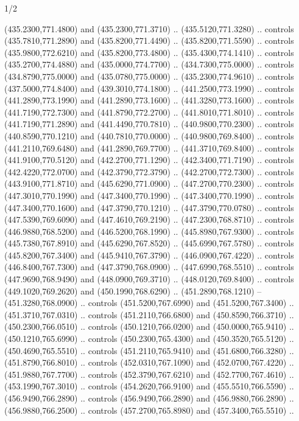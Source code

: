 \begin{flagdescription}{1/2}
\begin{scope}[xshift=0.5\flaglength]
\begin{scope}[scale=0.00745\flagwidth,xshift=-12.1mm,yshift=41.7mm]
\begin{scope}[y=0.80pt, x=0.80pt, yscale=-1, xscale=1, inner sep=0pt, outer sep=0pt]
\begin{scope}[cm={{1.33333,0.0,0.0,-1.33333,(0.0,114.66667)}}]
\begin{scope}[scale=0.100]
  (435.2300,771.4800) and (435.2300,771.3710) .. (435.5120,771.3280) .. controls
  (435.7810,771.2890) and (435.8200,771.4490) .. (435.8200,771.5590) .. controls
  (435.9800,772.6210) and (435.8200,773.4800) .. (435.4300,774.1410) .. controls
  (435.2700,774.4880) and (435.0000,774.7700) .. (434.7300,775.0000) .. controls
  (434.8790,775.0000) and (435.0780,775.0000) .. (435.2300,774.9610) .. controls
  (437.5000,774.8400) and (439.3010,774.1800) .. (441.2500,773.1990) .. controls
  (441.2890,773.1990) and (441.2890,773.1600) .. (441.3280,773.1600) .. controls
  (441.7190,772.7300) and (441.8790,772.2700) .. (441.8010,771.8010) .. controls
  (441.7190,771.2890) and (441.4490,770.7810) .. (440.9800,770.2300) .. controls
  (440.8590,770.1210) and (440.7810,770.0000) .. (440.9800,769.8400) .. controls
  (441.2110,769.6480) and (441.2890,769.7700) .. (441.3710,769.8400) .. controls
  (441.9100,770.5120) and (442.2700,771.1290) .. (442.3400,771.7190) .. controls
  (442.4220,772.0700) and (442.3790,772.3790) .. (442.2700,772.7300) .. controls
  (443.9100,771.8710) and (445.6290,771.0900) .. (447.2700,770.2300) .. controls
  (447.3010,770.1990) and (447.3400,770.1990) .. (447.3400,770.1990) .. controls
  (447.3400,770.1600) and (447.3790,770.1210) .. (447.3790,770.0780) .. controls
  (447.5390,769.6090) and (447.4610,769.2190) .. (447.2300,768.8710) .. controls
  (446.9880,768.5200) and (446.5200,768.1990) .. (445.8980,767.9300) .. controls
  (445.7380,767.8910) and (445.6290,767.8520) .. (445.6990,767.5780) .. controls
  (445.8200,767.3400) and (445.9410,767.3790) .. (446.0900,767.4220) .. controls
  (446.8400,767.7300) and (447.3790,768.0900) .. (447.6990,768.5510) .. controls
  (447.9690,768.9490) and (448.0900,769.3710) .. (448.0120,769.8400) .. controls
  (449.1020,769.2620) and (450.1990,768.6290) .. (451.2890,768.1210) --
  (451.3280,768.0900) .. controls (451.5200,767.6990) and (451.5200,767.3400) ..
  (451.3710,767.0310) .. controls (451.2110,766.6800) and (450.8590,766.3710) ..
  (450.2300,766.0510) .. controls (450.1210,766.0200) and (450.0000,765.9410) ..
  (450.1210,765.6990) .. controls (450.2300,765.4300) and (450.3520,765.5120) ..
  (450.4690,765.5510) .. controls (451.2110,765.9410) and (451.6800,766.3280) ..
  (451.8790,766.8010) .. controls (452.0310,767.1090) and (452.0700,767.4220) ..
  (451.9880,767.7700) .. controls (452.3790,767.6210) and (452.7700,767.4610) ..
  (453.1990,767.3010) .. controls (454.2620,766.9100) and (455.5510,766.5590) ..
  (456.9490,766.2890) .. controls (456.9490,766.2890) and (456.9880,766.2890) ..
  (456.9880,766.2500) .. controls (457.2700,765.8980) and (457.3400,765.5510) ..

\end{scope}
\end{scope}
\end{scope}
\end{scope}
\end{scope}
\end{flagdescription}
